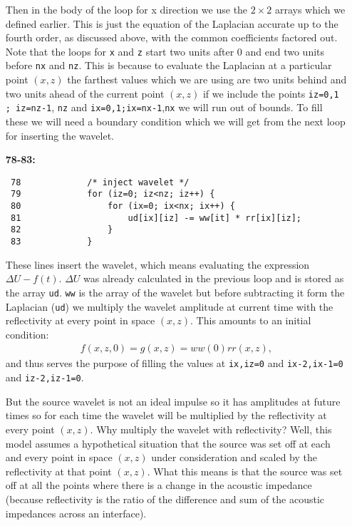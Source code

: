 \begin{itemize}
Then in the body of the loop for x direction we use the $2\times2$ arrays which we defined earlier.  This is just the equation of the Laplacian accurate up to the fourth order, as discussed            above, with the common coefficients factored out.  Note that the loops for \texttt{x} and \texttt{z} start two units after 0 and end two units before \texttt{nx} and \texttt{nz}. This is because to evaluate the Laplacian at a particular point $(x,z)$ the farthest values which we are using are           two units behind and two units ahead of the current point $(x,z)$ if we include the points \texttt{iz=0,1 ; iz=nz-1}, \texttt{nz} and \texttt{ix=0,1;ix=nx-1},\texttt{nx} we will run out of bounds. To fill these we will need a boundary condition which we will get from the next loop for           inserting the wavelet.



\item [\bf 78-83:]
\begin{verbatim}
 78             /* inject wavelet */
 79             for (iz=0; iz<nz; iz++) {
 80                 for (ix=0; ix<nx; ix++) {
 81                     ud[ix][iz] -= ww[it] * rr[ix][iz];
 82                 }
 83             }
\end{verbatim}


These lines insert the wavelet, which means evaluating the expression $\Delta U - f(t)$.
$\Delta U$ was already calculated in the previous loop and is stored as the array \texttt{ud}. \texttt{ww} is the array of the wavelet but before subtracting it form the Laplacian (\texttt{ud}) we multiply the wavelet amplitude at current time with the reflectivity at every point in space $(x,z)$. This amounts to an initial condition:
\begin{gather*}
    f(x,z,0) = g(x,z) = ww(0)rr(x,z),
\end{gather*}
and thus serves the purpose of filling the values at \texttt{ix,iz=0} and \texttt{ix-2,ix-1=0} and \texttt{iz-2,iz-1=0}.
            
But the source wavelet is not an ideal impulse so it has amplitudes at future times so for each time the wavelet will be multiplied by the reflectivity at every point $(x,z)$.
Why multiply the wavelet with reflectivity? Well, this model assumes  a hypothetical situation that the source was set off at each and every point in space $(x,z)$ under consideration and scaled by the reflectivity at that point $(x,z)$. What this means is that the source was set off at all the points where there is a change in the acoustic impedance (because reflectivity is the ratio of the difference and sum of the acoustic impedances across an interface).  


\end{itemize}
